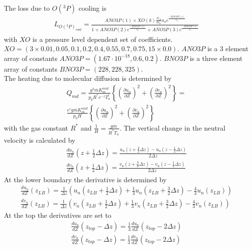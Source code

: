 %
\\
The loss due to $O(^3P)$ cooling is
%
\begin{align}
  L_{O(^3P)_{cool}} = \frac{ANO3P(1) \times XO(k) \frac{N_A}{m_o} n_o
  e^{\frac{-BNO3P(1)}{T_n}}}{1+ANO3P(2) e^{\frac{-BNO3P(2)}{T_n}}+ANO3P(3)
  e^{\frac{-BNO3P(3)}{T_n}}}
\end{align}
%
with $XO$ is a pressure level dependent set of coefficients. $XO = (3 \times 0.01,
0.05,0.1,0.2,0.4,0.55,0.7,0.75,15\times 0.0)$. $ANO3P$ is a 3 element array of
constants $ANO3P = (1.67 \cdot 10^{-18},0.6,0.2)$. $BNO3P$ is a three element array
of constants $BNO3P = (228,228,325)$.
\\

The heating due to molecular diffusion is determined by
%
\begin{align}
  Q_{md} = \frac{g^2 \overline{m} K_m^{mid}}{p_0 R^* e^{-z} T_n^t}
  \left\{ \left(\frac{\partial u_n}{\partial Z}\right)^2 +
  \left(\frac{\partial v_n}{\partial Z}\right)^2 \right\} = \\
  \frac{e^z g \overline{m} K_m^{mid}}{p_0 H}
  \left\{ \left(\frac{\partial u_n}{\partial Z}\right)^2 +
  \left(\frac{\partial v_n}{\partial Z}\right)^2 \right\}
\end{align}
%
with the gas constant $R^*$ and
$\frac{1}{H}= \frac{g \overline{m}}{R^* T_n}$. The vertical change
in the neutral velocity is calculated by
%
\begin{align}
  \frac{d u_n}{d Z}(z + \frac{1}{2}\Delta z) = \frac{u_n(z + \frac{3}{2}\Delta z ) -
                                               u_n(z - \frac{1}{2}\Delta z )}{2 \Delta
                                               z} \\
  \frac{d v_n}{d Z}(z + \frac{1}{2}\Delta z) = \frac{v_n(z + \frac{3}{2}\Delta z ) -
                                               v_n(z - \frac{1}{2}\Delta z )}{2 \Delta
                                               z}
\end{align}
%
At the lower boundary the derivative is determined by
%
\begin{align}
  \frac{d u_n}{d Z}(z_{LB}) = \frac{1}{\Delta z}\left( u_n(z_{LB} + \frac{1}{2}\Delta z)
        + \frac{1}{3} u_n(z_{LB} + \frac{3}{2}\Delta z) -
        \frac{4}{3} u_n(z_{LB})\right) \\
  \frac{d v_n}{d Z}(z_{LB}) = \frac{1}{\Delta z}\left( v_n(z_{LB} + \frac{1}{2}\Delta z)
        + \frac{1}{3} v_n(z_{LB} + \frac{3}{2}\Delta z) -
        \frac{4}{3} v_n(z_{LB})\right)
\end{align}
%
At the top the derivatives are set to
%
\begin{align}
  \frac{d u_n}{d Z}(z_{top}-\Delta z) = \frac{1}{3}\frac{d u_n}{d Z}(z_{top}-2 \Delta z) \\
  \frac{d v_n}{d Z}(z_{top}-\Delta z) = \frac{1}{3}\frac{d v_n}{d Z}(z_{top}-2 \Delta z)
\end{align}
%
\\

